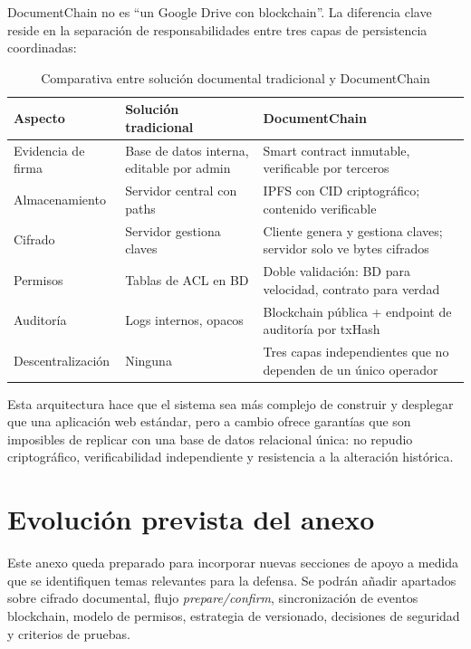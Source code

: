 \documentclass[11pt, a4paper]{article}
\begin{document}
DocumentChain no es ``un Google Drive con blockchain''. La diferencia clave reside en la separaci\'on de responsabilidades entre tres capas de persistencia coordinadas:

\begin{table}[H]
    \centering
    \small
    \begin{tabular}{|p{3.5cm}|p{5cm}|p{5cm}|}
    \hline
    \textbf{Aspecto} & \textbf{Soluci\'on tradicional} & \textbf{DocumentChain} \\
    \hline
    Evidencia de firma & Base de datos interna, editable por admin & Smart contract inmutable, verificable por terceros \\
    \hline
    Almacenamiento & Servidor central con paths & IPFS con CID criptogr\'afico; contenido verificable \\
    \hline
    Cifrado & Servidor gestiona claves & Cliente genera y gestiona claves; servidor solo ve bytes cifrados \\
    \hline
    Permisos & Tablas de ACL en BD & Doble validaci\'on: BD para velocidad, contrato para verdad \\
    \hline
    Auditor\'ia & Logs internos, opacos & Blockchain p\'ublica + endpoint de auditor\'ia por txHash \\
    \hline
    Descentralizaci\'on & Ninguna & Tres capas independientes que no dependen de un \'unico operador \\
    \hline
    \end{tabular}
    \caption{Comparativa entre soluci\'on documental tradicional y DocumentChain}
    \label{tab:diferencial}
\end{table}

Esta arquitectura hace que el sistema sea m\'as complejo de construir y desplegar que una aplicaci\'on web est\'andar, pero a cambio ofrece garant\'ias que son imposibles de replicar con una base de datos relacional \'unica: no repudio criptogr\'afico, verificabilidad independiente y resistencia a la alteraci\'on hist\'orica.

\section{Evolución prevista del anexo}

Este anexo queda preparado para incorporar nuevas secciones de apoyo a medida que se identifiquen temas relevantes para la defensa. Se podrán añadir apartados sobre cifrado documental, flujo \textit{prepare/confirm}, sincronización de eventos blockchain, modelo de permisos, estrategia de versionado, decisiones de seguridad y criterios de pruebas.
\end{document}
